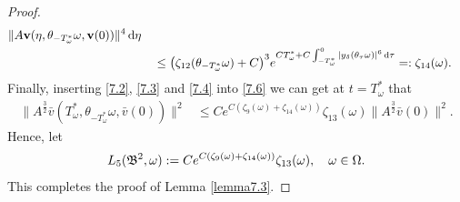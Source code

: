 \documentclass{elsarticle}
\theoremstyle{definition}
\numberwithin{equation}{section}
\renewcommand{\d}{{\rm{d}}}
\begin{document}
\begin{proof}
\begin{align}
 \|A \textbf{v}(\eta, \theta_{-{T_\omega^*}} \omega, \textbf{v}(0))\|^4 \, \d \eta \nonumber \\
 &   \quad  \leq  \big( \zeta_{12}(\theta_{-{T_\omega^*}}\omega)  +C \big)^3  e^{ C {T_\omega^*}+C \int^0_{-{T_\omega^*}}  |y_\delta(\theta_{\tau} \omega)|^6 \, \d \tau} =:\zeta_{14}(\omega).
\end{align}
Finally, inserting     \eqref{7.2}, \eqref{7.3}  and \eqref{7.4}  into \eqref{7.6}  we can get at $t=T_\omega^*$ that
\begin{align}
 \|A^\frac32\bar{v}(T_\omega^* ,\theta_{-T_\omega^* }\omega,\bar{v}(0))\|^2
&\leq Ce^{  C (\zeta_9(\omega)+\zeta_{14}(\omega)) } \zeta_{13}(\omega) \|A^\frac32\bar{v}(0)\|^2. \nonumber
\end{align}
Hence, let
\begin{align*}
 L_5 (\mathfrak B^2, \omega) :=   Ce^{ C (\zeta_9(\omega)+\zeta_{14}(\omega)) } \zeta_{13}(\omega) ,\quad \omega\in \Omega. \qedhere
\end{align*}
This completes the proof of Lemma \ref{lemma7.3}.
\end{proof}
\end{document}
